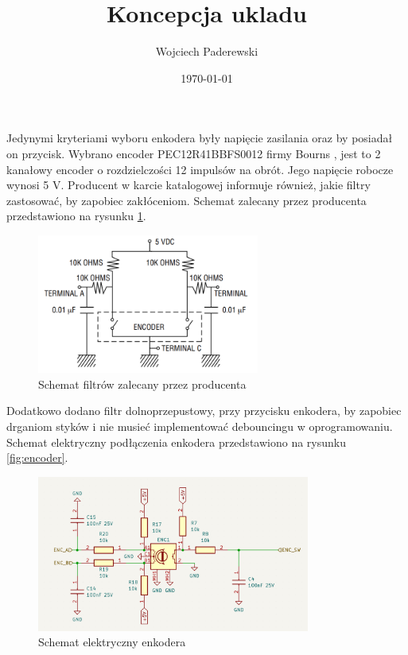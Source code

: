 \documentclass[../../main.tex]{subfiles}
\author{Wojciech Paderewski}
\date{\today}
\title{Koncepcja ukladu}
\begin{document}
Jedynymi kryteriami wyboru enkodera były napięcie zasilania oraz by posiadał on przycisk.
Wybrano encoder PEC12R\-41BBF\-S0012 firmy Bourns \cite{st:encoder}, jest to 2 kanałowy encoder o rozdzielczości 12 impulsów na obrót. 
Jego napięcie robocze wynosi 5 V. Producent w karcie katalogowej informuje również, jakie filtry zastosować, by zapobiec zakłóceniom.
Schemat zalecany przez producenta przedstawiono na rysunku \ref{fig:encoder_karta}.

\begin{figure}[H]
    \centering
    \includegraphics[width=0.65\textwidth]{encoder_karta.png}
    \caption{Schemat filtrów zalecany przez producenta \cite{st:encoder}}
    \label{fig:encoder_karta}
\end{figure}

Dodatkowo dodano filtr dolnoprzepustowy, przy przycisku enkodera, by zapobiec drganiom styków i nie musieć implementować debouncingu w oprogramowaniu.
Schemat elektryczny podłączenia enkodera przedstawiono na rysunku \ref{fig:encoder}.
\begin{figure}[H]
    \centering
    \includegraphics[width=0.8\textwidth]{encoder.png}
    \caption{Schemat elektryczny enkodera}
\end{figure}
\end{document}
